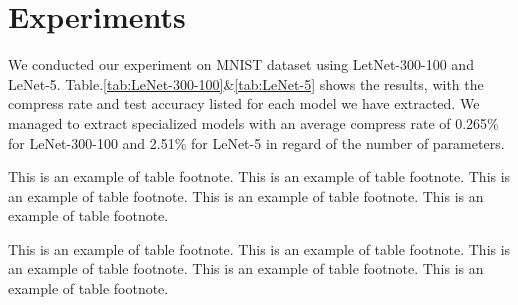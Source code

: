 \documentclass{acmtog} %
\begin{document}
\section{Experiments}
\label{sec:experiments}
%
We conducted our experiment on MNIST\cite{MNIST} dataset using LetNet-300-100 and LeNet-5.
Table.\ref{tab:LeNet-300-100}\&\ref{tab:LeNet-5} shows the results, with the compress rate and test accuracy listed for each model we have extracted. We managed to extract specialized models with an average compress rate of 0.265\% for LeNet-300-100 and 2.51\% for LeNet-5 in regard of the number of parameters.


\begin{table*}[htbp]
\label{tab:LeNet-300-100}
\begin{tabnote}
This is an example of table footnote. This is an example of table footnote. This is an example of table footnote.
This is an example of table footnote. This is an example of table footnote.
\end{tabnote}
\end{table*}

\begin{table*}[htbp]
\label{tab:LeNet-5}
\begin{tabnote}
This is an example of table footnote. This is an example of table footnote. This is an example of table footnote.
This is an example of table footnote. This is an example of table footnote.
\end{tabnote}
\end{table*}
\end{document}
